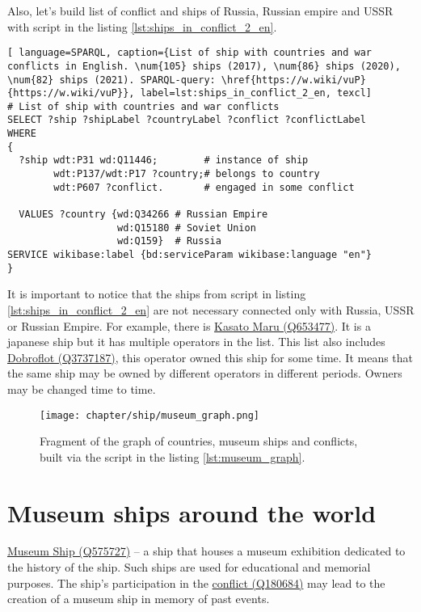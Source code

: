 \label{question:ship_3}

Also, let's build list of conflict and ships of Russia, Russian empire and USSR with script in the listing \ref{lst:ships_in_conflict_2_en}.

\begin{lstlisting}[ language=SPARQL, caption={List of ship with countries and war conflicts in English. \num{105} ships (2017), \num{86} ships (2020), \num{82} ships (2021). SPARQL-query: \href{https://w.wiki/vuP}{https://w.wiki/vuP}}, label=lst:ships_in_conflict_2_en, texcl]
# List of ship with countries and war conflicts
SELECT ?ship ?shipLabel ?countryLabel ?conflict ?conflictLabel
WHERE
{
  ?ship wdt:P31 wd:Q11446;        # instance of ship
        wdt:P137/wdt:P17 ?country;# belongs to country
        wdt:P607 ?conflict.       # engaged in some conflict
  
  VALUES ?country {wd:Q34266 # Russian Empire
                   wd:Q15180 # Soviet Union
                   wd:Q159}  # Russia
SERVICE wikibase:label {bd:serviceParam wikibase:language "en"}
}
\end{lstlisting}

It is important to notice that the ships from script in listing \ref{lst:ships_in_conflict_2_en} are not necessary connected only with Russia, USSR or Russian Empire. For example, there is \href{https://www.wikidata.org/wiki/Q653477}{Kasato Maru (Q653477)}. It is a japanese ship but it has multiple operators in the list. This list also includes \href{https://www.wikidata.org/wiki/Q3737187}{Dobroflot (Q3737187)}, this operator owned this ship for some time. It means that the same ship may be owned by different operators in different periods. Owners may be changed time to time.

\begin{figure*}[ht]
  \texttt{[image: chapter/ship/museum\_graph.png]}
  \caption[Graph of countries and museum ships]{Fragment of the graph of countries, museum ships and conflicts, built via the script in the listing \ref{lst:museum_graph}.}%
  \label{fig:museum_graph}%
\end{figure*}
\section{Museum ships around the world}
\href{https://www.wikidata.org/wiki/Q575727}{Museum Ship (Q575727)} -- a ship that houses a museum exhibition dedicated to the history of the ship. Such ships are used for educational and memorial purposes. The ship's participation in the \href{https://www.wikidata.org/wiki/Q180684}{conflict (Q180684)} may lead to the creation of a museum ship in memory of past events.

